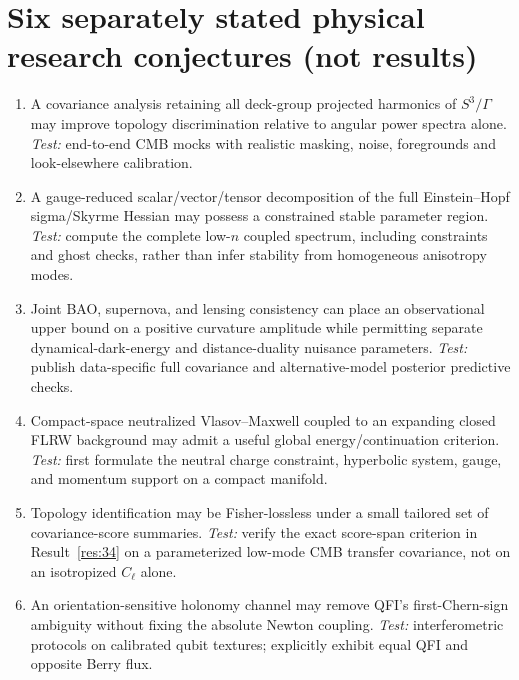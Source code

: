 \documentclass[aps,prd,onecolumn,notitlepage,groupedaddress,11pt]{revtex4-2}
\begin{document}
\section{Six separately stated physical research conjectures (not results)}
\begin{enumerate}
\item A covariance analysis retaining all deck-group projected harmonics of $S^3/\Gamma$ may improve topology discrimination relative to angular power spectra alone. \emph{Test:} end-to-end CMB mocks with realistic masking, noise, foregrounds and look-elsewhere calibration.
\item A gauge-reduced scalar/vector/tensor decomposition of the full Einstein--Hopf sigma/Skyrme Hessian may possess a constrained stable parameter region. \emph{Test:} compute the complete low-$n$ coupled spectrum, including constraints and ghost checks, rather than infer stability from homogeneous anisotropy modes.
\item Joint BAO, supernova, and lensing consistency can place an observational upper bound on a positive curvature amplitude while permitting separate dynamical-dark-energy and distance-duality nuisance parameters. \emph{Test:} publish data-specific full covariance and alternative-model posterior predictive checks.
\item Compact-space neutralized Vlasov--Maxwell coupled to an expanding closed FLRW background may admit a useful global energy/continuation criterion. \emph{Test:} first formulate the neutral charge constraint, hyperbolic system, gauge, and momentum support on a compact manifold.
\item Topology identification may be Fisher-lossless under a small tailored set of covariance-score summaries. \emph{Test:} verify the exact score-span criterion in Result~\ref{res:34} on a parameterized low-mode CMB transfer covariance, not on an isotropized $C_\ell$ alone.
\item An orientation-sensitive holonomy channel may remove QFI's first-Chern-sign ambiguity without fixing the absolute Newton coupling. \emph{Test:} interferometric protocols on calibrated qubit textures; explicitly exhibit equal QFI and opposite Berry flux.
\end{enumerate}
\end{document}
